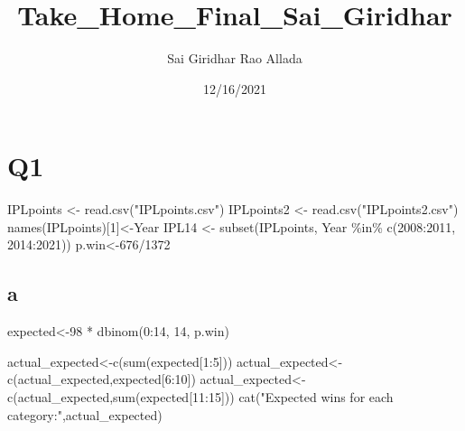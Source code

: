 \documentclass[
]{article}
\title{Take\_Home\_Final\_Sai\_Giridhar}
\author{Sai Giridhar Rao Allada}
\date{12/16/2021}
\newenvironment{Shaded}{\begin{snugshade}}{\end{snugshade}}
\newcommand{\DecValTok}[1]{\textcolor[rgb]{0.00,0.00,0.81}{#1}}
\newcommand{\FunctionTok}[1]{\textcolor[rgb]{0.00,0.00,0.00}{#1}}
\newcommand{\NormalTok}[1]{#1}
\newcommand{\OtherTok}[1]{\textcolor[rgb]{0.56,0.35,0.01}{#1}}
\newcommand{\SpecialCharTok}[1]{\textcolor[rgb]{0.00,0.00,0.00}{#1}}
\newcommand{\StringTok}[1]{\textcolor[rgb]{0.31,0.60,0.02}{#1}}
\begin{document}
\maketitle

\hypertarget{q1}{%
\section{Q1}\label{q1}}

\begin{Shaded}
\begin{Highlighting}[]
\NormalTok{IPLpoints }\OtherTok{\textless{}{-}} \FunctionTok{read.csv}\NormalTok{(}\StringTok{"IPLpoints.csv"}\NormalTok{)}
\NormalTok{IPLpoints2 }\OtherTok{\textless{}{-}} \FunctionTok{read.csv}\NormalTok{(}\StringTok{"IPLpoints2.csv"}\NormalTok{)}
\FunctionTok{names}\NormalTok{(IPLpoints)[}\DecValTok{1}\NormalTok{]}\OtherTok{\textless{}{-}}\StringTok{\textquotesingle{}Year\textquotesingle{}}
\NormalTok{IPL14 }\OtherTok{\textless{}{-}} \FunctionTok{subset}\NormalTok{(IPLpoints, Year }\SpecialCharTok{\%in\%} \FunctionTok{c}\NormalTok{(}\DecValTok{2008}\SpecialCharTok{:}\DecValTok{2011}\NormalTok{, }\DecValTok{2014}\SpecialCharTok{:}\DecValTok{2021}\NormalTok{))}
\NormalTok{p.win}\OtherTok{\textless{}{-}}\DecValTok{676}\SpecialCharTok{/}\DecValTok{1372}
\end{Highlighting}
\end{Shaded}

\hypertarget{a}{%
\subsection{a}\label{a}}

\begin{Shaded}
\begin{Highlighting}[]
\NormalTok{expected}\OtherTok{\textless{}{-}}\DecValTok{98} \SpecialCharTok{*} \FunctionTok{dbinom}\NormalTok{(}\DecValTok{0}\SpecialCharTok{:}\DecValTok{14}\NormalTok{, }\DecValTok{14}\NormalTok{, p.win)}

\NormalTok{actual\_expected}\OtherTok{\textless{}{-}}\FunctionTok{c}\NormalTok{(}\FunctionTok{sum}\NormalTok{(expected[}\DecValTok{1}\SpecialCharTok{:}\DecValTok{5}\NormalTok{]))}
\NormalTok{actual\_expected}\OtherTok{\textless{}{-}}\FunctionTok{c}\NormalTok{(actual\_expected,expected[}\DecValTok{6}\SpecialCharTok{:}\DecValTok{10}\NormalTok{])}
\NormalTok{actual\_expected}\OtherTok{\textless{}{-}}\FunctionTok{c}\NormalTok{(actual\_expected,}\FunctionTok{sum}\NormalTok{(expected[}\DecValTok{11}\SpecialCharTok{:}\DecValTok{15}\NormalTok{]))}
\FunctionTok{cat}\NormalTok{(}\StringTok{"Expected wins for each category:"}\NormalTok{,actual\_expected)}
\end{Highlighting}
\end{Shaded}
\end{document}
